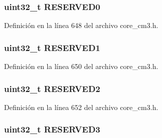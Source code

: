 \subsubsection[{\texorpdfstring{R\+E\+S\+E\+R\+V\+E\+D0}{RESERVED0}}]{\setlength{\rightskip}{0pt plus 5cm}uint32\+\_\+t R\+E\+S\+E\+R\+V\+E\+D0}\hypertarget{struct_i_t_m___type_a63deb05e7a614fd290562e511a2979ff}{}\label{struct_i_t_m___type_a63deb05e7a614fd290562e511a2979ff}


Definición en la línea 648 del archivo core\+\_\+cm3.\+h.

\subsubsection[{\texorpdfstring{R\+E\+S\+E\+R\+V\+E\+D1}{RESERVED1}}]{\setlength{\rightskip}{0pt plus 5cm}uint32\+\_\+t R\+E\+S\+E\+R\+V\+E\+D1}\hypertarget{struct_i_t_m___type_a162d8d4bcf80ad9b8f01af570ed81058}{}\label{struct_i_t_m___type_a162d8d4bcf80ad9b8f01af570ed81058}


Definición en la línea 650 del archivo core\+\_\+cm3.\+h.

\subsubsection[{\texorpdfstring{R\+E\+S\+E\+R\+V\+E\+D2}{RESERVED2}}]{\setlength{\rightskip}{0pt plus 5cm}uint32\+\_\+t R\+E\+S\+E\+R\+V\+E\+D2}\hypertarget{struct_i_t_m___type_ade93d21b11103a1e89c36b9120b4cbf0}{}\label{struct_i_t_m___type_ade93d21b11103a1e89c36b9120b4cbf0}


Definición en la línea 652 del archivo core\+\_\+cm3.\+h.

\subsubsection[{\texorpdfstring{R\+E\+S\+E\+R\+V\+E\+D3}{RESERVED3}}]{\setlength{\rightskip}{0pt plus 5cm}uint32\+\_\+t R\+E\+S\+E\+R\+V\+E\+D3}\hypertarget{struct_i_t_m___type_a5f6279765c35211755691cab040f7cbd}{}\label{struct_i_t_m___type_a5f6279765c35211755691cab040f7cbd}


